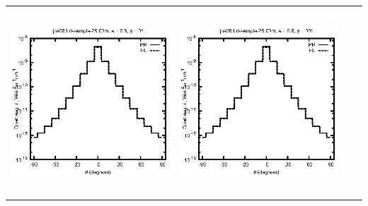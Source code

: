 \documentclass[10pt,a4paper]{article}
\begin{document}
\begin{adjustwidth}{-1.2in}{-1.2in}
\begin{tabular}{c c c c}
\includegraphics[height=7cm]{../eps/jok08_Ld_sample_25.00m_fwd.eps} &
\includegraphics[height=7cm]{../eps/jok08_Ld_sample_25.00m_cross.eps} \\
\end{tabular}

\pagebreak


\end{adjustwidth}
\end{document}
